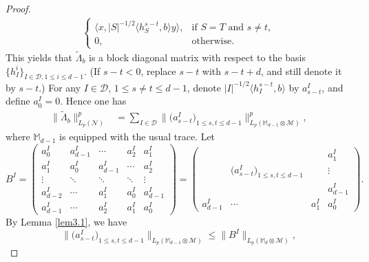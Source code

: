 \documentclass[oneside,english,a4wide]{amsart}
\numberwithin{equation}{section}
\numberwithin{figure}{section}
\theoremstyle{plain}
\theoremstyle{plain}
\theoremstyle{definition}
\theoremstyle{plain}
\theoremstyle{remark}
\theoremstyle{definition}
\theoremstyle{remark}
\theoremstyle{definition}
\newcommand{\8}{\infty}
\begin{document}
\begin{proof}
\begin{equation*}
\begin{aligned}
\begin{cases}
				\langle x,|S|^{-1/2}\langle h_S^{s-t},b\rangle y\rangle ,& \text{if $S=T$ and $s\neq t$},\\
				0,& \text{otherwise}.
			\end{cases}
		\end{aligned}
	\end{equation*}
	This yields that $\tilde{\varLambda}_b$ is a block diagonal matrix with respect to the basis $\{h_I^i\}_{I\in\mathcal{D}, 1\leq i\leq d-1}$. (If $s-t< 0$, replace $s-t$ with $s-t+d$, and still denote it by $s-t$.)
	For any $I\in \mathcal{ D}$, $1\leq s\neq t \leq d-1$, denote $|I|^{-1/2}\langle h_I^{s-t},b\rangle$ by $a^I_{s-t}$, and define $a_0^I=0$.
	Hence one has
	\begin{equation*}
		\begin{aligned}
			\|\tilde{\varLambda}_b\|_{L_p(\mathcal{N})}^p{}&=\sum_{I\in\mathcal{D}}\biggl\|\biggl(a_{s-t}^I\biggr)_{1\le s,t\le d-1}\biggr\|_{L_p(\mathbb{M}_{d-1}\otimes\mathcal{M})}^p,
		\end{aligned}
	\end{equation*}
	where $\mathbb{M}_{d-1}$ is equipped with the usual trace.
	Let 
	\begin{equation}\label{BI}
		B^I=\begin{pmatrix}
			a_0^I       & a_{d-1}^I & \cdots    & a_2^I    & a_1^I \\
			a_1^I       & a_0^I       & a_{d-1}^I & \cdots & a_2^I \\
			\vdots    & \ddots    & \ddots    & \ddots & \vdots \\
			a_{d-2}^I & \cdots    & a_1^I       & a_0^I    & a_{d-1}^I  \\
			a_{d-1}^I & \cdots    & a_2^I      & a_1^I    & a_0^I
		\end{pmatrix}
		=\begin{pmatrix}
			&  &   & a_1^I \\
			&  \biggl(a_{s-t}^I\biggr)_{1\le s,t\le d-1}    & &\vdots  \\
			&  & & a_{d-1}^I \\
			a_{d-1}^I      & \cdots  & a_1^I  & a_0^I
		\end{pmatrix}.
	\end{equation}
	By Lemma \ref{lem3.1}, we have 
	\[\biggl\|\biggl(a_{s-t}^I\biggr)_{1\le s,t\le d-1}\biggr\|_{L_p(\mathbb{M}_{d-1}\otimes \mathcal{M})}\le \|B^I\|_{L_p(\mathbb{M}_{d}\otimes\mathcal{M})},\]

\end{proof}
\end{document}
